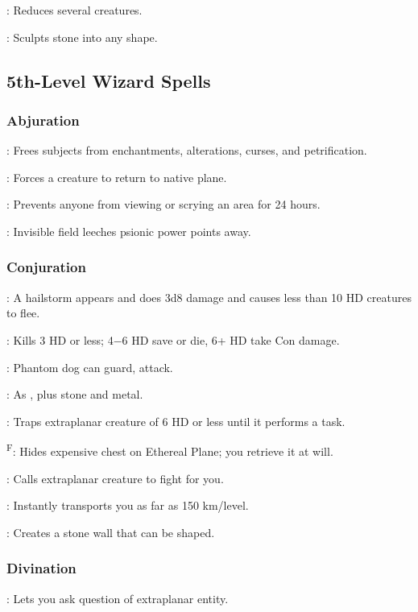 	: Reduces several creatures.

	: Sculpts stone into any shape.



\subsection{5th-Level Wizard Spells}

\subsubsection{Abjuration}
	: Frees subjects from enchantments, alterations, curses, and petrification.

	: Forces a creature to return to native plane.

	: Prevents anyone from viewing or scrying an area for 24 hours.

	: Invisible field leeches psionic power points away.

\subsubsection{Conjuration}
	: A hailstorm appears and does 3d8 damage and causes less than 10 HD creatures to flee. %

	: Kills 3 HD or less; 4$-6$ HD save or die, 6+ HD take Con damage.

	: Phantom dog can guard, attack.

	: As , plus stone and metal.

	: Traps extraplanar creature of 6 HD or less until it performs a task.

	\textsuperscript{F}: Hides expensive chest on Ethereal Plane; you retrieve it at will.

	: Calls extraplanar creature to fight for you.

	: Instantly transports you as far as 150 km/level.

	: Creates a stone wall that can be shaped.

\subsubsection{Divination}
	: Lets you ask question of extraplanar entity.


